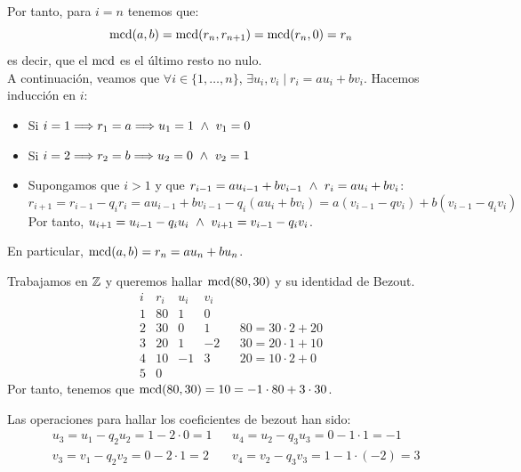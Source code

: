 \begin{enumerate}
    Por tanto, para $i=n$ tenemos que: $$\operatorname{mcd}(a,b) = \operatorname{mcd}(r_n, r_{n+1}) = \operatorname{mcd}(r_n, 0) = r_n$$
    es decir, que el $\operatorname{mcd}$ es el último resto no nulo.\\
    
    A continuación, veamos que $\forall i \in \{1, \ldots, n\}$, $\exists u_i, v_i \mid r_i = au_i + bv_i$. Hacemos inducción en $i$:
    \begin{itemize}
        \item Si $i=1 \Longrightarrow r_1 = a \Longrightarrow u_1 = 1 \ \land \  v_1 = 0$
        \item Si $i=2 \Longrightarrow r_2 = b \Longrightarrow u_2 = 0 \ \land \  v_2 = 1$
        \item Supongamos que $i>1$ y que $r_{i-1} = au_{i-1}+bv_{i-1} \ \land \  r_i = au_i + bv_i$:
        $$r_{i+1} = r_{i-1}-q_ir_i = au_{i-1}+bv_{i-1} - q_i(au_i +bv_i) = a(v_{i-1}-qv_i)+b(v_{i-1}-q_iv_i)$$
        Por tanto, $u_{i+1} = u_{i-1}-q_iu_i \ \land \  v_{i+1} = v_{i-1}-q_iv_i$.
    \end{itemize}
\end{enumerate}

En particular, $\operatorname{mcd}(a,b) = r_n =au_n + bu_n$.

\begin{ejemplo}
    Trabajamos en $\mathbb Z$ y queremos hallar $\operatorname{mcd}(80,30)$ y su identidad de Bezout.
    $$\begin{array}{c|c|c|c||cl}
        i & r_i & u_i & v_i && \\
        \hline
        1 & 80  & 1   & 0 &&   \\
        2 & 30  & 0   & 1 &&  80=30\cdot 2 + 20\\
        3 & 20  & 1   & -2 && 30 = 20 \cdot 1 + 10\\
        4 & 10  & -1  & 3  &&  20 = 10\cdot 2 + 0\\
        5 & 0   &     &&& 
    \end{array}$$
    Por tanto, tenemos que $\operatorname{mcd}(80,30) = 10 = -1 \cdot 80 + 3 \cdot 30$.
    
    Las operaciones para hallar los coeficientes de bezout han sido:
    \begin{align*}
        & u_3 = u_1 - q_2u_2 = 1- 2 \cdot 0 = 1
        && u_4 = u_2 - q_3u_3 = 0 - 1 \cdot 1 = -1\\
        & v_3 = v_1 - q_2v_2 = 0 - 2\cdot 1 = 2 
        && v_4 = v_2 - q_3v_3 = 1 - 1\cdot(-2) = 3
    \end{align*}
\end{ejemplo}



